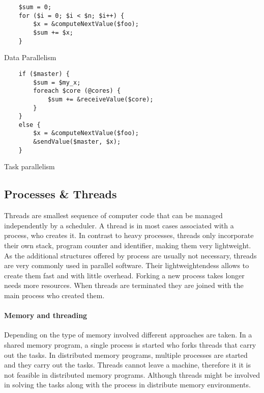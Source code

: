 \documentclass{article}
\begin{document}
	\begin{code}
	\begin{lstlisting}
	$sum = 0;
	for ($i = 0; $i < $n; $i++) {
		$x = &computeNextValue($foo);
		$sum += $x;
	}
	\end{lstlisting}
	\caption{Data Parallelism}
	\end{code}
	\label{code:dataParalellism}

	\begin{code}
	\begin{lstlisting}
	if ($master) {
		$sum = $my_x;
		foreach $core (@cores) {
			$sum += &receiveValue($core);
		}
	}
	else {
		$x = &computeNextValue($foo);
		&sendValue($master, $x);
	}
	\end{lstlisting}
	\caption{Task parallelism}
	\end{code}
	\label{code:taskParalellism}

\subsection{Processes \& Threads} %
\label{sub:processes_&_threads}
Threads are smallest sequence of computer code that can be managed independently by a scheduler. %
A thread is in most cases associated with a process,
who creates it.
In contrast to heavy processes,
threads only incorporate their own stack, program counter and identifier,
making them very lightweight.
As the additional structures offered by process are usually not necessary,
threads are very commonly used in parallel software.
Their lightweightendess allows to create them fast and with little overhead.
Forking a new process takes longer needs more resources.
When threads are terminated they are joined with the main process who created them.

\paragraph*{Memory and threading} %
\label{par:memory_and_threading}
	Depending on the type of memory involved different approaches are taken.
	In a shared memory program,
	a single process is started who forks threads that carry out the tasks.
	In distributed memory programs,
	multiple processes are started and they carry out the tasks.
	Threads cannot leave a machine,
	therefore it it is not feasible in distributed memory programs.
	Although threads might be involved in solving the tasks along with the process in distribute memory environments.\\
\end{document}
